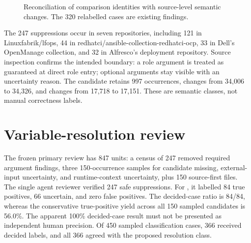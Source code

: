 \begin{figure}[htbp]
\centering
{}
\caption{Reconciliation of comparison identities with source-level semantic
changes. The 320 relabelled cases are existing findings.}
\label{fig:v007_variable_change}
\end{figure}

The 247 suppressions occur in seven repositories, including 121 in
Linuxfabrik/lfops, 44 in redhatci/ansible-collection-redhatci-ocp, 33 in
Dell's OpenManage collection, and 32 in Alfresco's deployment repository.
Source inspection confirms the intended boundary: a 
role argument is treated as guaranteed at direct role entry; optional
arguments stay visible with an uncertainty reason. The candidate retains 997
 occurrences, changes
 from 34,006 to 34,326, and changes
 from 17,718 to 17,151. These are semantic
classes, not manual correctness labels.

\section{Variable-resolution review}
The frozen primary review has 847 units: a census of 247 removed required
argument findings, three 150-occurrence samples for candidate missing,
external-input uncertainty, and runtime-context uncertainty, plus 150
source-first files. The single agent reviewer verified 247 safe suppressions.
For , it labelled 84 true positives, 66 uncertain,
and zero false positives. The decided-case ratio is 84/84, whereas the
conservative true-positive yield across all 150 sampled candidates is 56.0\%.
The apparent 100\% decided-case result must not be presented as independent
human precision. Of 450 sampled classification cases, 366 received decided
labels, and all 366 agreed with the proposed resolution class.


